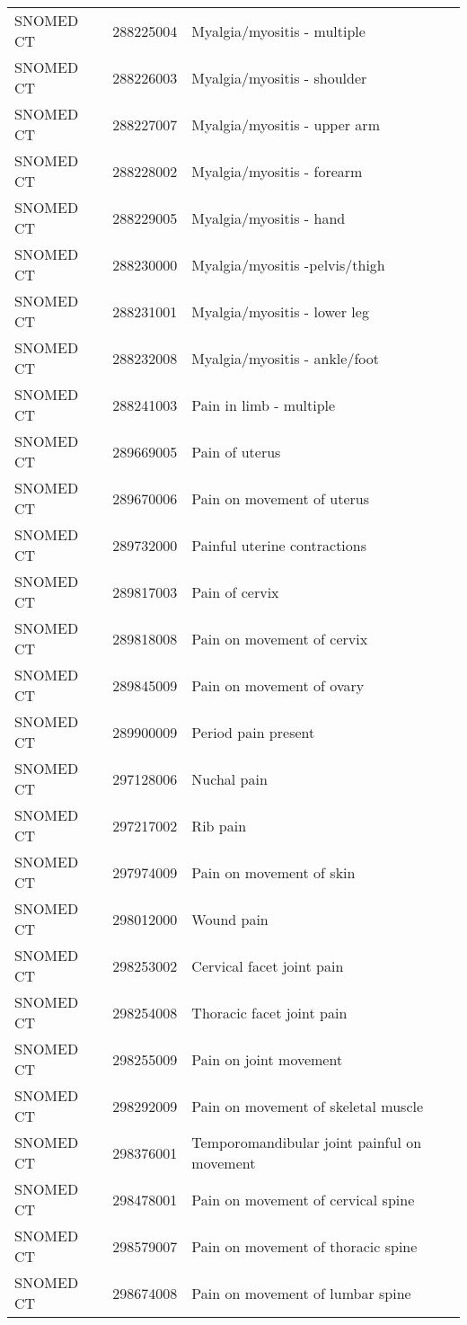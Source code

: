 \begin{longtable}{p{}p{}p{}}
  SNOMED CT & 288225004 & Myalgia/myositis - multiple \\ 
  SNOMED CT & 288226003 & Myalgia/myositis - shoulder \\ 
  SNOMED CT & 288227007 & Myalgia/myositis - upper arm \\ 
  SNOMED CT & 288228002 & Myalgia/myositis - forearm \\ 
  SNOMED CT & 288229005 & Myalgia/myositis - hand \\ 
  SNOMED CT & 288230000 & Myalgia/myositis -pelvis/thigh \\ 
  SNOMED CT & 288231001 & Myalgia/myositis - lower leg \\ 
  SNOMED CT & 288232008 & Myalgia/myositis - ankle/foot \\ 
  SNOMED CT & 288241003 & Pain in limb - multiple \\ 
  SNOMED CT & 289669005 & Pain of uterus \\ 
  SNOMED CT & 289670006 & Pain on movement of uterus \\ 
  SNOMED CT & 289732000 & Painful uterine contractions \\ 
  SNOMED CT & 289817003 & Pain of cervix \\ 
  SNOMED CT & 289818008 & Pain on movement of cervix \\ 
  SNOMED CT & 289845009 & Pain on movement of ovary \\ 
  SNOMED CT & 289900009 & Period pain present \\ 
  SNOMED CT & 297128006 & Nuchal pain \\ 
  SNOMED CT & 297217002 & Rib pain \\ 
  SNOMED CT & 297974009 & Pain on movement of skin \\ 
  SNOMED CT & 298012000 & Wound pain \\ 
  SNOMED CT & 298253002 & Cervical facet joint pain \\ 
  SNOMED CT & 298254008 & Thoracic facet joint pain \\ 
  SNOMED CT & 298255009 & Pain on joint movement \\ 
  SNOMED CT & 298292009 & Pain on movement of skeletal muscle \\ 
  SNOMED CT & 298376001 & Temporomandibular joint painful on movement \\ 
  SNOMED CT & 298478001 & Pain on movement of cervical spine \\ 
  SNOMED CT & 298579007 & Pain on movement of thoracic spine \\ 
  SNOMED CT & 298674008 & Pain on movement of lumbar spine \\ 

\end{longtable}
